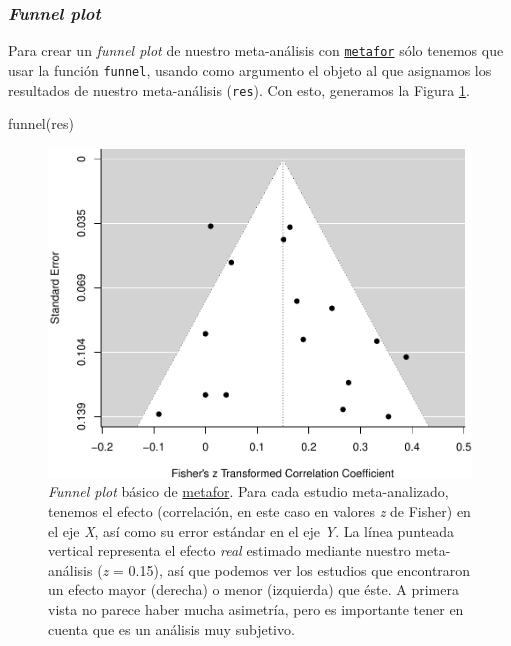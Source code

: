 \documentclass[
  bookmarksnumbered]{article}
\newenvironment{Shaded}{\begin{snugshade}}{\end{snugshade}}
\newcommand{\FunctionTok}[1]{\textcolor[rgb]{0.39,0.29,0.61}{#1}}
\newcommand{\NormalTok}[1]{\textcolor[rgb]{0.12,0.11,0.11}{#1}}
\begin{document}
\hypertarget{funnel-plot}{%
\subsubsection{\texorpdfstring{\emph{Funnel plot}}{Funnel plot}}\label{funnel-plot}}

Para crear un \emph{funnel plot} de nuestro meta-análisis con \href{https://www.metafor-project.org/doku.php}{\texttt{metafor}} sólo tenemos que usar la función \texttt{funnel}, usando como argumento el objeto al que asignamos los resultados de nuestro meta-análisis (\texttt{res}). Con esto, generamos la Figura \ref{fig:funnel-plot1}.

\begin{Shaded}
\begin{Highlighting}[]
\FunctionTok{funnel}\NormalTok{(res)}
\end{Highlighting}
\end{Shaded}

\begin{figure}
\centering
\includegraphics{Meta-analysis_files/figure-latex/funnel-plot1-1.pdf}
\caption{\label{fig:funnel-plot1}\emph{Funnel plot} básico de \href{https://www.metafor-project.org/doku.php}{metafor}. Para cada estudio meta-analizado, tenemos el efecto (correlación, en este caso en valores \emph{z} de Fisher) en el eje \emph{X}, así como su error estándar en el eje \emph{Y}. La línea punteada vertical representa el efecto \emph{real} estimado mediante nuestro meta-análisis (\emph{z} = 0.15), así que podemos ver los estudios que encontraron un efecto mayor (derecha) o menor (izquierda) que éste. A primera vista no parece haber mucha asimetría, pero es importante tener en cuenta que es un análisis muy subjetivo.}
\end{figure}
\end{document}
